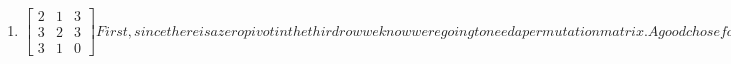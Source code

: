 \begin{enumerate}[label=(\alph*)]
        \item 
            \begin{subequations}
                \begin{equation}
                    \begin{bmatrix}
                        2       &       1       &   3   \\
                        3       &       2       &   3   \\
                        3       &       1       &   0 
                    \end{bmatrix}
                \end{equation}
                First, since there is a zero pivot in the third row 
                we know were going to need a permutation matrix. A good
                chose for this problem would be to make the following row
                switches, 
                \begin{equation}
                    r_{1} \rightarrow r_{3}
                \end{equation}
                \begin{equation}
                    r_{2} \rightarrow r_{1}
                \end{equation}
                \begin{equation}
                    r_{1} \rightarrow r_{3}
                \end{equation}
                Therefore we get 
                \begin{equation}
                    PA = 
                    \begin{bmatrix}
                        0       &       1       &   0   \\
                        0       &       0       &   1   \\
                        1       &       0       &   0  
                    \end{bmatrix}
                    \begin{bmatrix}
                        2       &       1       &   3   \\
                        3       &       2       &   3   \\
                        3       &       1       &   0 
                    \end{bmatrix}
                    =
                    \begin{bmatrix}
                        3       &       2       &   3   \\

\end{bmatrix}
\end{equation}
\end{subequations}
\end{enumerate}
